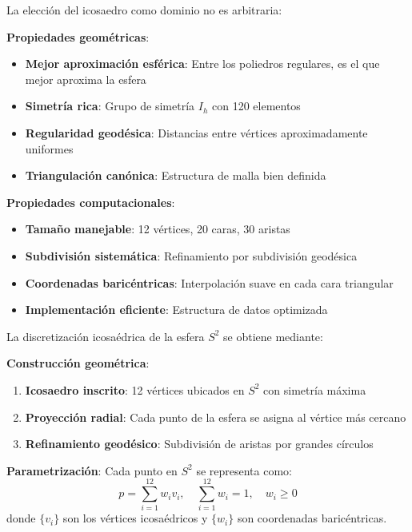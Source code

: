 \begin{example}
La elección del icosaedro como dominio no es arbitraria:

\textbf{Propiedades geométricas}:
\begin{itemize}
    \item \textbf{Mejor aproximación esférica}: Entre los poliedros regulares, es el que mejor aproxima la esfera
    \item \textbf{Simetría rica}: Grupo de simetría $I_h$ con 120 elementos
    \item \textbf{Regularidad geodésica}: Distancias entre vértices aproximadamente uniformes
    \item \textbf{Triangulación canónica}: Estructura de malla bien definida
\end{itemize}

\textbf{Propiedades computacionales}:
\begin{itemize}
    \item \textbf{Tamaño manejable}: 12 vértices, 20 caras, 30 aristas
    \item \textbf{Subdivisión sistemática}: Refinamiento por subdivisión geodésica
    \item \textbf{Coordenadas baricéntricas}: Interpolación suave en cada cara triangular
    \item \textbf{Implementación eficiente}: Estructura de datos optimizada
\end{itemize}
\end{example}

\begin{definition}\label{def:discretizacion_icosaedrica}
La discretización icosaédrica de la esfera $S^2$ se obtiene mediante:

\textbf{Construcción geométrica}:
\begin{enumerate}
    \item \textbf{Icosaedro inscrito}: 12 vértices ubicados en $S^2$ con simetría máxima
    \item \textbf{Proyección radial}: Cada punto de la esfera se asigna al vértice más cercano
    \item \textbf{Refinamiento geodésico}: Subdivisión de aristas por grandes círculos
\end{enumerate}

\textbf{Parametrización}: Cada punto en $S^2$ se representa como:
\begin{equation}
p = \sum_{i=1}^{12} w_i v_i, \quad \sum_{i=1}^{12} w_i = 1, \quad w_i \geq 0
\end{equation}
donde $\{v_i\}$ son los vértices icosaédricos y $\{w_i\}$ son coordenadas baricéntricas.
\end{definition}

